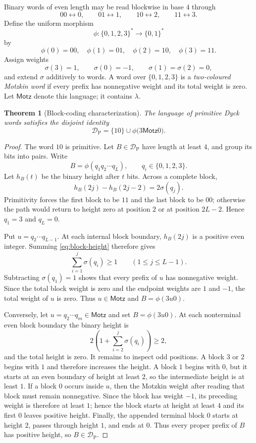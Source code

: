\documentclass[11pt]{article}
\theoremstyle{plain}
\newtheorem{theorem}{Theorem}
\theoremstyle{definition}
\newcommand{\DP}{\mathcal{D}_{\mathrm{P}}}
\begin{document}
Binary words of even length may be read blockwise in base $4$ through
\[
 00\leftrightarrow0,\qquad
 01\leftrightarrow1,\qquad
 10\leftrightarrow2,\qquad
 11\leftrightarrow3.
\]
Define the uniform morphism
\[
 \phi:\{0,1,2,3\}^*\longrightarrow\{0,1\}^*
\]
by
\[
 \phi(0)=00,\quad \phi(1)=01,\quad
 \phi(2)=10,\quad \phi(3)=11.
\]
Assign weights
\[
 \sigma(3)=1,\qquad \sigma(0)=-1,\qquad
 \sigma(1)=\sigma(2)=0,
\]
and extend $\sigma$ additively to words.  A word over
$\{0,1,2,3\}$ is a \emph{two-coloured Motzkin word} if every prefix has
nonnegative weight and its total weight is zero.  Let $\mathsf{Motz}$
denote this language; it contains $\lambda$.

\begin{theorem}[Block-coding characterization]\label{thm:block-coding}
The language of primitive Dyck words satisfies the disjoint identity
\begin{equation}\label{eq:block-coding-language}
 \DP=\{10\}\cup\phi\bigl(3\mathsf{Motz}0\bigr).
\end{equation}
\end{theorem}

\begin{proof}
The word $10$ is primitive.  Let $B\in\DP$ have length at least $4$, and
group its bits into pairs.  Write
\[
 B=\phi(q_1q_2\cdots q_L),
 \qquad q_i\in\{0,1,2,3\}.
\]
Let $h_B(t)$ be the binary height after $t$ bits.  Across a complete block,
\begin{equation}\label{eq:block-height}
 h_B(2j)-h_B(2j-2)=2\sigma(q_j).
\end{equation}
Primitivity forces the first block to be $11$ and the last block to be
$00$; otherwise the path would return to height zero at position $2$ or
at position $2L-2$.  Hence $q_1=3$ and $q_L=0$.

Put $u=q_2\cdots q_{L-1}$.  At each internal block boundary,
$h_B(2j)$ is a positive even integer.  Summing
\eqref{eq:block-height} therefore gives
\[
 \sum_{i=1}^{j}\sigma(q_i)\geq1
 \qquad(1\leq j\leq L-1).
\]
Subtracting $\sigma(q_1)=1$ shows that every prefix of $u$ has
nonnegative weight.  Since the total block weight is zero and the endpoint
weights are $1$ and $-1$, the total weight of $u$ is zero.  Thus
$u\in\mathsf{Motz}$ and $B=\phi(3u0)$.

Conversely, let $u=q_2\cdots q_m\in\mathsf{Motz}$ and set
$B=\phi(3u0)$.  At each nonterminal even block boundary the binary height
is
\[
 2\left(1+\sum_{i=2}^{j}\sigma(q_i)\right)\geq2,
\]
and the total height is zero.  It remains to inspect odd positions.  A
block $3$ or $2$ begins with $1$ and therefore increases the height.  A
block $1$ begins with $0$, but it starts at an even boundary of height at
least $2$, so the intermediate height is at least $1$.  If a block $0$
occurs inside $u$, then the Motzkin weight after reading that block must
remain nonnegative.  Since the block has weight $-1$, its preceding weight
is therefore at least $1$; hence the block starts at height at least $4$
and its first $0$ leaves positive height.  Finally, the appended terminal block
$0$ starts at height $2$, passes through height $1$, and ends at $0$.
Thus every proper prefix of $B$ has positive height, so $B\in\DP$.
\end{proof}
\end{document}
